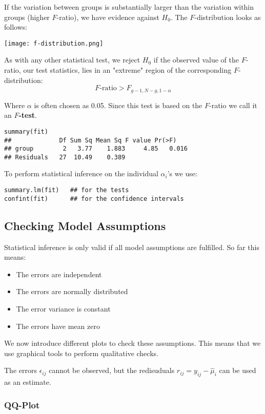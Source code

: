 If the variation between groups is substantially larger than the variation within groups (higher $F$-ratio), we have evidence against $H_0$. The $F$-distribution looks as follows:
\begin{center}
	\texttt{[image: f-distribution.png]}
\end{center}

As with any other statistical test, we reject $H_0$ if the observed value of the $F$-ratio, our test statistics, lies in an "extreme" region of the corresponding $F$-distribution:
$$F \text{-ratio} > F_{g-1, N-g, 1 - \alpha}$$

Where $\alpha$ is often chosen as 0.05. Since this test is based on the $F$-ratio we call it an \textbf{$F$-test}.

\begin{lstlisting}
summary(fit)
##             Df Sum Sq Mean Sq F value Pr(>F)
## group        2   3.77    1.883     4.85   0.016
## Residuals   27  10.49    0.389
\end{lstlisting}

To perform statistical inference on the individual $\alpha_i$'s we use:
\begin{lstlisting}
summary.lm(fit)   ## for the tests
confint(fit)      ## for the confidence intervals
\end{lstlisting}


\subsection{Checking Model Assumptions}

Statistical inference is only valid if all model assumptions are fulfilled. So far this means:
\begin{itemize}
	\item The errors are independent
	\item The errors are normally distributed
	\item The error variance is constant
	\item The errors have mean zero
\end{itemize}

We now introduce different plots to check these assumptions. This means that we use graphical tools to perform qualitative checks.\medskip

The errors $\epsilon_{ij}$ cannot be observed, but the redisuduals $r_{ij} = y_{ij} - \hat \mu_{i}$ can be used as an estimate.

\subsubsection{QQ-Plot}

